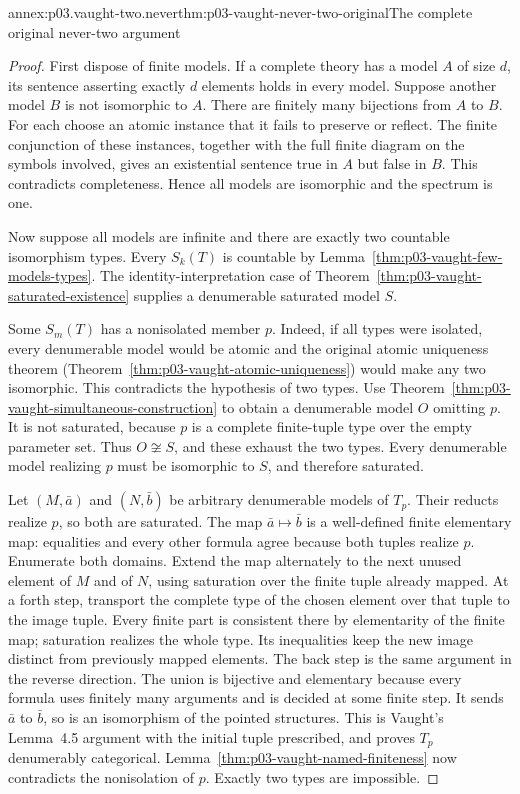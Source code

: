 \begin{annexitem}{annex:p03.vaught-two.never}{thm:p03-vaught-never-two-original}{The complete original never-two argument}
\begin{proof}
First dispose of finite models. If a complete theory has a model \(A\)
of size \(d\), its sentence asserting exactly \(d\) elements holds
in every model. Suppose another model \(B\) is not isomorphic to \(A\).
There are finitely many bijections from \(A\) to \(B\). For each choose
an atomic instance that it fails to preserve or reflect. The finite
conjunction of these instances, together with the full finite diagram on
the symbols involved, gives an existential sentence true in \(A\) but
false in \(B\). This contradicts completeness. Hence all models are
isomorphic and the spectrum is one.

Now suppose all models are infinite and there are exactly two countable
isomorphism types. Every \(S_k(T)\) is countable by
Lemma~\ref{thm:p03-vaught-few-models-types}. The identity-interpretation
case of Theorem~\ref{thm:p03-vaught-saturated-existence} supplies a
denumerable saturated model \(S\).

Some \(S_m(T)\) has a nonisolated member \(p\). Indeed, if all types
were isolated, every denumerable model would be atomic and the original
atomic uniqueness theorem
(Theorem~\ref{thm:p03-vaught-atomic-uniqueness}) would make any two
isomorphic. This contradicts the hypothesis of two types.
Use Theorem~\ref{thm:p03-vaught-simultaneous-construction} to obtain
a denumerable model \(O\) omitting \(p\). It is not saturated, because
\(p\) is a complete finite-tuple type over the empty parameter set.
Thus \(O\not\cong S\), and these exhaust the two types. Every
denumerable model realizing \(p\) must be isomorphic to \(S\), and
therefore saturated.

Let \((M,\bar a)\) and \((N,\bar b)\) be arbitrary denumerable
models of \(T_p\). Their reducts realize \(p\), so both are saturated.
The map \(\bar a\mapsto\bar b\) is a well-defined finite elementary
map: equalities and every other formula agree because both tuples realize
\(p\). Enumerate both domains. Extend the map alternately to the next
unused element of \(M\) and of \(N\), using saturation over the finite
tuple already mapped. At a forth step, transport the complete type of the
chosen element over that tuple to the image tuple. Every finite part is
consistent there by elementarity of the finite map; saturation realizes the
whole type. Its inequalities keep the new image distinct from previously
mapped elements. The back step is the same argument in the reverse
direction. The union is bijective and elementary because every formula
uses finitely many arguments and is decided at some finite step.
It sends \(\bar a\) to \(\bar b\), so is an isomorphism of the
pointed structures. This is Vaught's Lemma~4.5 argument with the initial
tuple prescribed, and proves \(T_p\) denumerably categorical.
Lemma~\ref{thm:p03-vaught-named-finiteness} now contradicts the
nonisolation of \(p\). Exactly two types are impossible.


\end{proof}
\end{annexitem}
